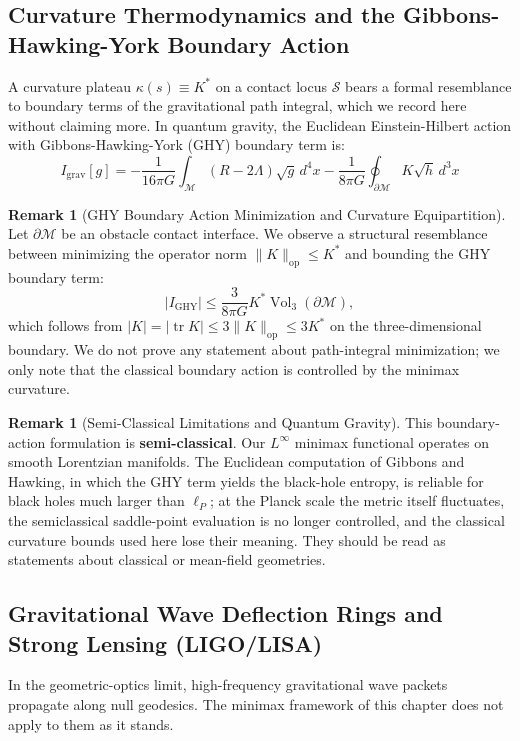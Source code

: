 \documentclass[11pt,reqno]{amsart}
\theoremstyle{definition}
\newtheorem{remark}[theorem]{Remark}
\newcommand{\op}{\mathrm{op}}
\numberwithin{equation}{section}
\begin{document}
\subsection{Curvature Thermodynamics and the Gibbons-Hawking-York Boundary Action}
\label{subsec:curvature_thermodynamics}
A curvature plateau $\kappa(s) \equiv K^*$ on a contact locus $\mathcal{S}$ bears a formal resemblance to boundary terms of the gravitational path integral, which we record here without claiming more.
In quantum gravity, the Euclidean Einstein-Hilbert action with Gibbons-Hawking-York (GHY) boundary term is:
\begin{equation}
I_{\mathrm{grav}}[g] = -\frac{1}{16\pi G} \int_{\mathcal{M}} (R - 2\Lambda) \sqrt{g} \, d^4x - \frac{1}{8\pi G} \oint_{\partial\mathcal{M}} K \sqrt{h} \, d^3x
\end{equation}

\begin{remark}[GHY Boundary Action Minimization and Curvature Equipartition]
\label{thm:curvature_equipartition}
Let $\partial\mathcal{M}$ be an obstacle contact interface. We observe a structural resemblance between minimizing the operator norm $\|K\|_{\op} \le K^*$ and bounding the GHY boundary term:
\begin{equation}
|I_{\mathrm{GHY}}| \le \frac{3}{8\pi G} K^* \operatorname{Vol}_3(\partial\mathcal{M}),
\end{equation}
which follows from $|K| = |\operatorname{tr} K| \le 3\|K\|_{\op} \le 3K^*$ on the three-dimensional boundary. We do not prove any statement about path-integral minimization; we only note that the classical boundary action is controlled by the minimax curvature.
\end{remark}

\begin{remark}[Semi-Classical Limitations and Quantum Gravity]
This boundary-action formulation is \textbf{semi-classical}. Our $L^\infty$ minimax functional operates on smooth Lorentzian manifolds. The Euclidean computation of Gibbons and Hawking, in which the GHY term yields the black-hole entropy, is reliable for black holes much larger than $\ell_P$; at the Planck scale the metric itself fluctuates, the semiclassical saddle-point evaluation is no longer controlled, and the classical curvature bounds used here lose their meaning. They should be read as statements about classical or mean-field geometries.
\end{remark}

\subsection{Gravitational Wave Deflection Rings and Strong Lensing (LIGO/LISA)}
\label{subsec:lensing_ligo_lisa}
In the geometric-optics limit, high-frequency gravitational wave packets propagate along null geodesics. The minimax framework of this chapter does not apply to them as it stands.
\end{document}
